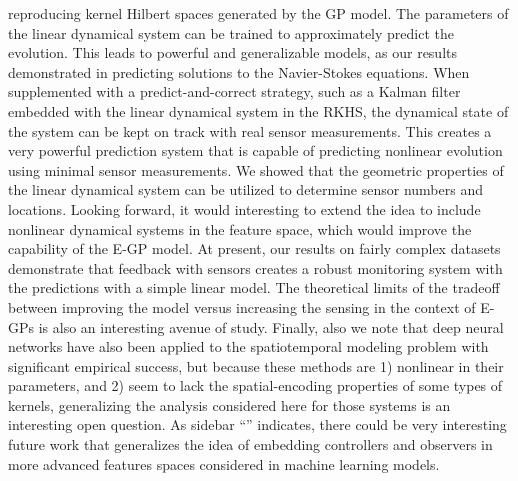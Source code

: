reproducing kernel Hilbert spaces generated by the GP model. The parameters of the linear dynamical system can be trained to approximately predict the evolution. This leads to powerful and generalizable models, as our results demonstrated in predicting solutions to the Navier-Stokes equations. When supplemented with a predict-and-correct strategy, such as a Kalman filter embedded with the linear dynamical system in the RKHS, the dynamical state of the system can be kept on track with real sensor measurements. This creates a very powerful prediction system that is capable of predicting nonlinear evolution using minimal sensor measurements. We showed that the geometric properties of the linear dynamical system can be utilized to determine sensor numbers and locations. Looking forward, it would interesting to extend the idea to include nonlinear dynamical systems in the feature space, which would improve the capability of the E-GP model. At present, our results on fairly complex datasets demonstrate that feedback with sensors creates a robust monitoring system with the predictions with a simple linear model. The theoretical limits of the tradeoff between improving the model versus increasing the sensing in the context of E-GPs is also an interesting avenue of study. Finally, also we note that deep neural networks have also been applied to the spatiotemporal modeling problem with significant empirical success\cite{tran2015learning}, but because these methods are 1) nonlinear in their parameters, and 2) seem to lack the spatial-encoding properties of some types of kernels, generalizing the analysis considered here for those systems is an interesting open question. As sidebar ``'' indicates, there could be very interesting future work that generalizes the idea of embedding controllers and observers in more advanced features spaces considered in machine learning models. %


